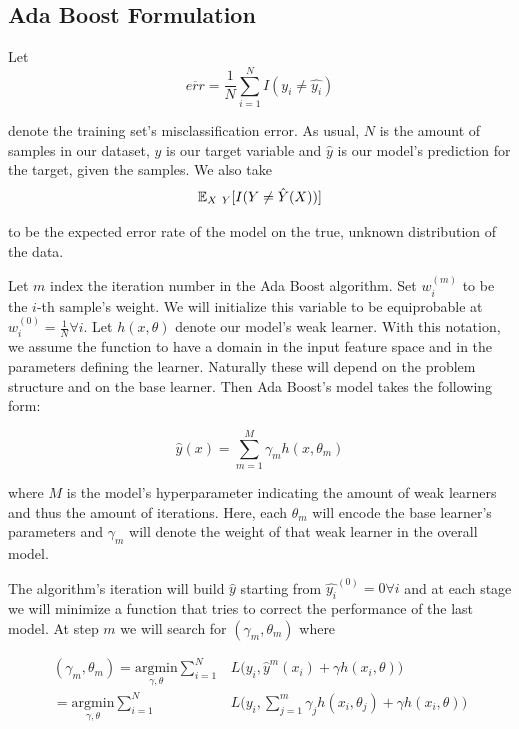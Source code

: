 \subsection{Ada Boost Formulation}\label{subsection:gradient_boosting_formulation}

Let
\begin{equation}\label{eq:adaBoostTrainingError}
\overline{err} = \frac{1}{N} \sum_{i=1}^{N} I(y_i \neq \hat{y_i})
\end{equation}

denote the training set's misclassification error. 
As usual, $N$ is the amount of samples in our dataset, $y$ is our target variable and $\hat{y}$ is our model's prediction for the target, given the samples. 
We also take
\begin{equation}
\operatorname{\mathbb{E}}_{X \ Y} [ I(Y \neq \hat{Y}(X)) ]
\end{equation}

to be the expected error rate of the model on the true, unknown distribution of the data.

Let $m$ index the iteration number in the Ada Boost algorithm. 
Set $w^{(m)}_i$ to be the $i$-th sample's weight. 
We will initialize this variable to be equiprobable at $w^{(0)}_i = \frac{1}{N} \forall i$. 
Let $h(x,\theta)$ denote our model's weak learner. 
With this notation, we assume the function to have a domain in the input feature space and in the parameters defining the learner. 
Naturally these will depend on the problem structure and on the base learner. 
Then Ada Boost's model takes the following form:

\begin{equation}\label{eq:adaBoostModel}
\hat{y}(x) = \sum_{m=1}^{M} \gamma_m h(x,\theta_m)
\end{equation}

where $M$ is the model's hyperparameter indicating the amount of weak learners and thus the amount of iterations. 
Here, each $\theta_m$ will encode the base learner's parameters and $\gamma_m$ will denote the weight of that weak learner in the overall model.

The algorithm's iteration will build $\hat{y}$ starting from $\hat{y_i}^{(0)}= 0 \forall i$ and at each stage we will minimize a function that tries to correct the performance of the last model. 
At step $m$ we will search for $(\gamma_{m}, \theta_{m})$ where

\begin{equation}\label{eq:adaBoostIteration}
\begin{split}
(\gamma_{m}, \theta_{m}) = \underset{\gamma, \theta}{\mathrm{argmin}} \sum_{i=1}^{N} & L\big( y_i,  \hat{y}^{m}(x_i) + \gamma h(x_i,\theta) \big) \\
= \underset{\gamma, \theta}{\mathrm{argmin}} \sum_{i=1}^{N} & L\big( y_i,  \sum_{j=1}^{m} \gamma_j h(x_i,\theta_j) + \gamma h(x_i,\theta) \big)
\end{split}
\end{equation}

